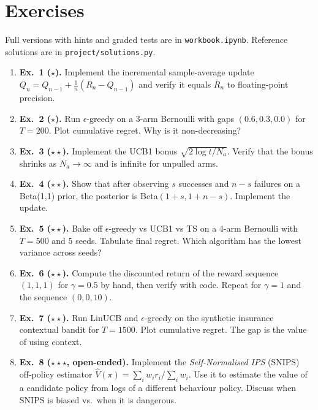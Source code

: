 \documentclass[11pt,oneside]{scrbook}
\begin{document}
\chapter{Exercises}
\label{ch:exercises}

Full versions with hints and graded tests are in \texttt{workbook.ipynb}.
Reference solutions are in \texttt{project/solutions.py}.

\begin{enumerate}[label={},leftmargin=0pt,labelsep=0pt]\setlength\itemsep{2pt}
  \item \textbf{Ex.\ 1 ($\star$).} Implement the incremental sample-average
        update $Q_n = Q_{n-1} + \tfrac{1}{n}(R_n - Q_{n-1})$ and verify it equals
        $\bar R_n$ to floating-point precision.
  \item \textbf{Ex.\ 2 ($\star$).} Run $\epsilon$-greedy on a 3-arm Bernoulli
        with gaps $(0.6,0.3,0.0)$ for $T=200$. Plot cumulative regret. Why is
        it non-decreasing?
  \item \textbf{Ex.\ 3 ($\star\star$).} Implement the UCB1 bonus
        $\sqrt{2\log t/N_a}$. Verify that the bonus shrinks as $N_a\to\infty$
        and is infinite for unpulled arms.
  \item \textbf{Ex.\ 4 ($\star\star$).} Show that after observing
        $s$ successes and $n-s$ failures on a Beta(1,1) prior, the posterior is
        Beta$(1+s,1+n-s)$. Implement the update.
  \item \textbf{Ex.\ 5 ($\star\star$).} Bake off $\epsilon$-greedy vs UCB1 vs
        TS on a 4-arm Bernoulli with $T=500$ and 5 seeds. Tabulate final
        regret. Which algorithm has the lowest variance across seeds?
  \item \textbf{Ex.\ 6 ($\star\star$).} Compute the discounted return of the
        reward sequence $(1, 1, 1)$ for $\gamma=0.5$ by hand, then verify with
        code. Repeat for $\gamma=1$ and the sequence $(0,0,10)$.
  \item \textbf{Ex.\ 7 ($\star\star$).} Run LinUCB and $\epsilon$-greedy on the
        synthetic insurance contextual bandit for $T=1500$. Plot cumulative regret. The gap
        is the value of using context.
  \item \textbf{Ex.\ 8 ($\star\star\star$, open-ended).} Implement the
        \emph{Self-Normalised IPS} (SNIPS) off-policy estimator
        $\widehat V(\pi) = \sum_i w_i r_i / \sum_i w_i$. Use it to estimate
        the value of a candidate policy from logs of a different behaviour
        policy. Discuss when SNIPS is biased vs.\ when it is dangerous.
\end{enumerate}
\end{document}
